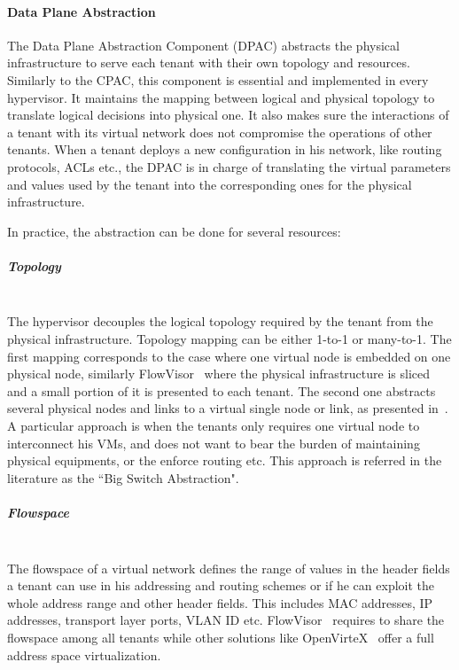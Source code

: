 \paragraph{Data Plane Abstraction}
\label{sec:abstraction_comp}
The Data Plane Abstraction Component (DPAC) abstracts the physical infrastructure to serve each tenant with their own topology and resources.
Similarly to the CPAC, this component is essential and implemented in every hypervisor.
It maintains the mapping between logical and physical topology to translate logical decisions into physical one.
It also makes sure the interactions of a tenant with its virtual network does not compromise the operations of other tenants. When a tenant deploys a new configuration in his network, like routing protocols, ACLs etc., the DPAC is in charge of translating the virtual parameters and values used by the tenant into the corresponding ones for the physical infrastructure.

In practice, the abstraction can be done for several resources:

\subparagraph{\textbf{Topology}}\textbf{}\\
The hypervisor decouples the logical topology required by the tenant from the physical infrastructure.
Topology mapping can be either 1-to-1 or many-to-1. 
The first mapping corresponds to the case where one virtual node is embedded on one physical node, similarly FlowVisor~\cite{FlowVisor-Sherwood2009} where the physical infrastructure is sliced and a small portion of it is presented to each tenant.
The second one abstracts several physical nodes and links to a virtual single node or link, as  presented in~\cite{OpenVirteX-Al-Shabibi2014}.
A particular approach is when the tenants only requires one virtual node to interconnect his VMs, and does not want to bear the burden of maintaining physical equipments, or the enforce routing etc. This approach is referred in the literature as the ``Big Switch Abstraction".


\subparagraph{\textbf{Flowspace}}\textbf{}\\
The flowspace of a virtual network defines the range of values in the header fields a tenant can use in his addressing and routing schemes or if he can exploit the whole address range and other header fields.
This includes MAC addresses, IP addresses, transport layer ports, VLAN ID etc.
FlowVisor~\cite{FlowVisor-Sherwood2009} requires to share the flowspace among all tenants while other solutions like OpenVirteX~\cite{OpenVirteX-Al-Shabibi2014} offer a full address space virtualization.

